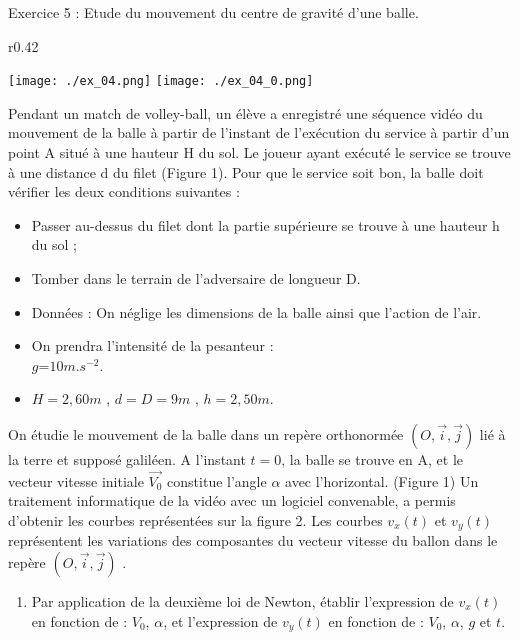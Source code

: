 \documentclass[12pt, french]{article}
\begin{document}
\begin{Box2}{Exercice 5 : Etude du mouvement du centre de gravité d’une balle. }

	\begin{wrapfigure}[12]{r}{0.42\textwidth}
  \begin{center}

	\texttt{[image: ./ex\_04.png]}
	\texttt{[image: ./ex\_04\_0.png]}
  \end{center}
\end{wrapfigure}


	Pendant un match de volley-ball, un élève a enregistré une séquence vidéo du
mouvement de la balle à partir de l’instant de l’exécution du service à partir d’un
point A situé à une hauteur H du sol. Le joueur ayant exécuté le service se trouve à
une distance d du filet (Figure 1).
Pour que le service soit bon, la balle doit vérifier les deux conditions suivantes :

\begin{itemize}
	\item Passer au-dessus du filet dont la partie supérieure se trouve à une hauteur h du sol ;
	\item Tomber dans le terrain de l’adversaire de longueur D.
	\item Données : On néglige les dimensions de la balle ainsi que l’action de l’air.
	\item On prendra l’intensité de la pesanteur : \\$g $=$10 m.s^{-2}$.
	\item $H = 2,60 m$ , $d = D = 9 m$ , $h = 2,50 m$.
\end{itemize}

On étudie le mouvement de la balle
dans un repère orthonormée $(O,\vec{i}, \vec{j})$
lié à la terre et supposé galiléen.
A l’instant $t = 0$, la balle se trouve
en A, et le vecteur vitesse initiale
$\vec{V_0}$ constitue l’angle $\alpha$ avec
l’horizontal. (Figure 1)
Un traitement informatique de la vidéo avec un logiciel convenable, a permis
d’obtenir les courbes représentées sur la figure 2.
Les courbes $v_x(t)$ et $v_y(t)$ représentent les variations des composantes du vecteur
vitesse du ballon dans le repère $(O,\vec{i}, \vec{j})$ .

\begin{enumerate}
\item Par application de la deuxième loi de
Newton, établir l’expression de $v_x(t)$ en
fonction de : $V_0$, $\alpha$, et l’expression de $v_y(t)$
en fonction de : $V_0$, $\alpha$, $g$ et $t$.


\end{enumerate}
\end{Box2}
\end{document}
